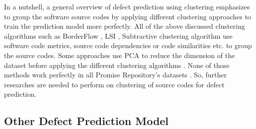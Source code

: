 \documentclass[12pt]{report}
\begin{document}
In a nutshell, a general overview of defect prediction using clustering emphasizes to group the software source codes by applying different clustering approaches to train the prediction model more perfectly. All of the above discussed clustering algorithms such as BorderFlow \cite{scanniello2013class}, LSI \cite{tan2011assessing}, Subtractive clustering algorithm \cite{sidhu2010subtractive} use software code metrics, source code dependencies or code similarities etc. to group the source codes. Some approaches use PCA to reduce the dimension of the dataset before applying the different clustering algorithms \cite{menzies2011local,menzies2013local,sidhu2010subtractive}. None of those methods work perfectly in all Promise Repository's datasets \cite{promise12}. So, further researches are needed to perform on clustering of source codes for defect prediction.






\subsection{Other Defect Prediction Model }
\end{document}
